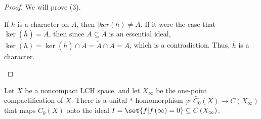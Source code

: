 \documentclass[10pt]{mypackage}
\begin{document}
\begin{proof}
  We will prove (3).
  \begin{description}[font=\normalfont]
    \item[(3)] If $h$ is a character on $A$, then $|ker\left(h\right) \neq A$. If it were the case that $\ker\left(\overline{h}\right) = \widetilde{A}$, then since $A\subseteq \widetilde{A}$ is an essential ideal, $\ker\left(h\right) = \ker\left(\overline{h}\right) \cap A = \widetilde{A} \cap A = A$, which is a contradiction. Thus, $\overline{h}$ is a character.
  \end{description}
\end{proof}

\begin{proposition}
  Let $X$ be a noncompact LCH space, and let $X_{\infty}$ be the one-point compactification of $X$. There is a unital $\ast$-homomorphism $\varphi\colon \widetilde{C_0}\left(X\right)\rightarrow C\left(X_{\infty}\right)$ that maps $C_0\left(X\right)$ onto the ideal $I = \set{f | f\left(\infty\right) = 0}\subseteq C\left(X_{\infty}\right)$.
\end{proposition}
\end{document}
